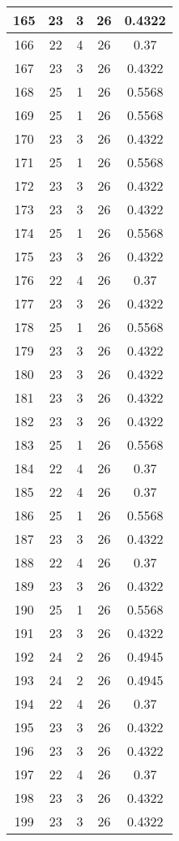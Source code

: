 \documentclass[letterpaper, 12pt]{article}
\begin{document}
\begin{longtable}{|c|c|c|c|c|}
\hline
165 & 23 & 3 & 26 & 0.4322 \\
\hline
166 & 22 & 4 & 26 & 0.37 \\
\hline
167 & 23 & 3 & 26 & 0.4322 \\
\hline
168 & 25 & 1 & 26 & 0.5568 \\
\hline
169 & 25 & 1 & 26 & 0.5568 \\
\hline
170 & 23 & 3 & 26 & 0.4322 \\
\hline
171 & 25 & 1 & 26 & 0.5568 \\
\hline
172 & 23 & 3 & 26 & 0.4322 \\
\hline
173 & 23 & 3 & 26 & 0.4322 \\
\hline
174 & 25 & 1 & 26 & 0.5568 \\
\hline
175 & 23 & 3 & 26 & 0.4322 \\
\hline
176 & 22 & 4 & 26 & 0.37 \\
\hline
177 & 23 & 3 & 26 & 0.4322 \\
\hline
178 & 25 & 1 & 26 & 0.5568 \\
\hline
179 & 23 & 3 & 26 & 0.4322 \\
\hline
180 & 23 & 3 & 26 & 0.4322 \\
\hline
181 & 23 & 3 & 26 & 0.4322 \\
\hline
182 & 23 & 3 & 26 & 0.4322 \\
\hline
183 & 25 & 1 & 26 & 0.5568 \\
\hline
184 & 22 & 4 & 26 & 0.37 \\
\hline
185 & 22 & 4 & 26 & 0.37 \\
\hline
186 & 25 & 1 & 26 & 0.5568 \\
\hline
187 & 23 & 3 & 26 & 0.4322 \\
\hline
188 & 22 & 4 & 26 & 0.37 \\
\hline
189 & 23 & 3 & 26 & 0.4322 \\
\hline
190 & 25 & 1 & 26 & 0.5568 \\
\hline
191 & 23 & 3 & 26 & 0.4322 \\
\hline
192 & 24 & 2 & 26 & 0.4945 \\
\hline
193 & 24 & 2 & 26 & 0.4945 \\
\hline
194 & 22 & 4 & 26 & 0.37 \\
\hline
195 & 23 & 3 & 26 & 0.4322 \\
\hline
196 & 23 & 3 & 26 & 0.4322 \\
\hline
197 & 22 & 4 & 26 & 0.37 \\
\hline
198 & 23 & 3 & 26 & 0.4322 \\
\hline
199 & 23 & 3 & 26 & 0.4322 \\
\hline
\end{longtable}
\end{document}
